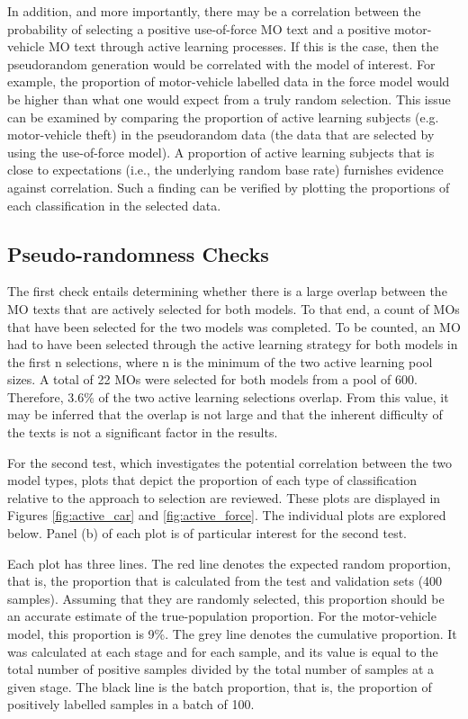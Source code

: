 In addition, and more importantly, there may be a correlation between the probability of selecting a positive use-of-force MO text and a positive motor-vehicle MO text through active learning processes. If this is the case, then the pseudorandom generation would be correlated with the model of interest. For example, the proportion of motor-vehicle labelled data in the force model would be higher than what one would expect from a truly random selection. This issue can be examined by comparing the proportion of active learning subjects (e.g. motor-vehicle theft) in the pseudorandom data (the data that are selected by using the use-of-force model). A proportion of active learning subjects that is close to expectations (i.e., the underlying random base rate) furnishes evidence against correlation. Such a finding can be verified by plotting the proportions of each classification in the selected data. 

\subsection{Pseudo-randomness Checks}

The first check entails determining whether there is a large overlap between the MO texts that are actively selected for both models. To that end, a count of MOs that have been selected for the two models was completed. To be counted, an MO had to have been selected through the active learning strategy for both models in the first n selections, where n is the minimum of the two active learning pool sizes. A total of 22 MOs were selected for both models from a pool of 600. Therefore, 3.6\% of the two active learning selections overlap. From this value, it may be inferred that the overlap is not large and that the inherent difficulty of the texts is not a significant factor in the results.

For the second test, which investigates the potential correlation between the two model types, plots that depict the proportion of each type of classification relative to the approach to selection are reviewed. These plots are displayed in Figures \ref{fig:active_car}  and \ref{fig:active_force}. The individual plots are explored below. Panel (b) of each plot is of particular interest for the second test.

Each plot has three lines. The red line denotes the expected random proportion, that is, the proportion that is calculated from the test and validation sets (400 samples). Assuming that they are randomly selected, this proportion should be an accurate estimate of the true-population proportion. For the motor-vehicle model, this proportion is 9\%. The grey line denotes the cumulative proportion. It was calculated at each stage and for each sample, and its value is equal to the total number of positive samples divided by the total number of samples at a given stage. The black line is the batch proportion, that is, the proportion of positively labelled samples in a batch of 100.

